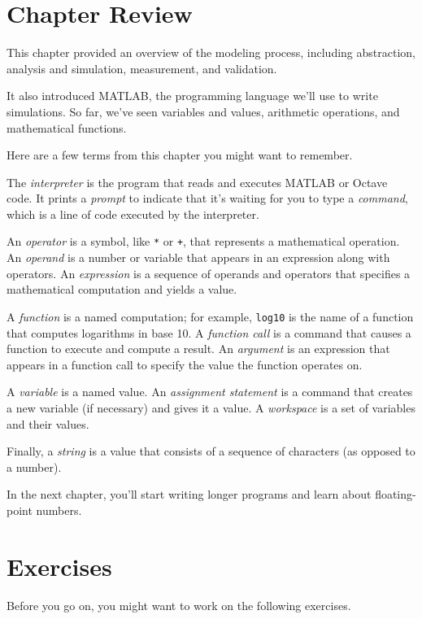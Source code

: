 \documentclass[../../book.tex]{subfiles}
\begin{document}
\section{Chapter Review}

This chapter provided an overview of the modeling process, including abstraction, analysis and simulation, measurement, and validation.

It also introduced MATLAB, the programming language we'll use to write simulations.  So far, we've seen variables and values, arithmetic operations, and mathematical functions.

Here are a few terms from this chapter you might want to remember.

The \emph{interpreter} is the program that reads and executes MATLAB or \mbox{Octave} code.
It prints a \emph{prompt} to indicate that it's waiting for you to type a \emph{command}, which is a line of code executed by the interpreter.

An \emph{operator} is a symbol, like \lstinline{*} or \lstinline{+}, that
represents a mathematical operation.
An \emph{operand} is a number or variable that appears in an expression along
with operators.
An \emph{expression} is a sequence of operands and operators that specifies
a mathematical computation and yields a value.

A \emph{function} is a named computation; for example, \lstinline{log10} is the
name of a function that computes logarithms in base 10.
A \emph{function call} is a command that causes a function to execute and compute a result.
An \emph{argument} is an expression that appears in a function call to
specify the value the function operates on.

A \emph{variable} is a named value. An \emph{assignment statement} is a command that creates a new variable (if necessary) and gives it a value.
A \emph{workspace} is a set of variables and their values.

Finally, a \emph{string} is a value that consists of a sequence of characters (as opposed to a number).

In the next chapter, you'll start writing longer programs and learn about floating-point numbers.

\section{Exercises}

Before you go on, you might want to work on the following exercises.
\end{document}
